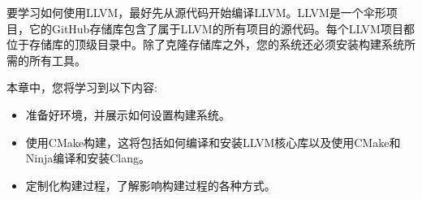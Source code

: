 
要学习如何使用LLVM，最好先从源代码开始编译LLVM。LLVM是一个伞形项目，它的GitHub存储库包含了属于LLVM的所有项目的源代码。每个LLVM项目都位于存储库的顶级目录中。除了克隆存储库之外，您的系统还必须安装构建系统所需的所有工具。\par

本章中，您将学习到以下内容:\par

\begin{itemize}
	\item 准备好环境，并展示如何设置构建系统。
	\item 使用CMake构建，这将包括如何编译和安装LLVM核心库以及使用CMake和Ninja编译和安装Clang。
	\item 定制化构建过程，了解影响构建过程的各种方式。
\end{itemize}


